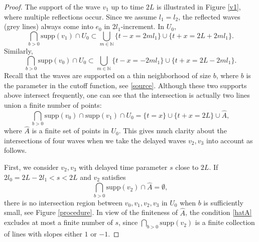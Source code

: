 \documentclass[11pt]{amsart}
\theoremstyle{definition}
\theoremstyle{plain}
\numberwithin{equation}{section}
\begin{document}
\begin{proof}
The support of the wave $v_1$ up to time $2L$ is illustrated in Figure \ref{v1}, where multiple reflections occur. Since we assume $l_1=l_2$, the reflected waves (grey lines) always come into $e_0$ in $2l_1$-increment.
In $U_0$,
$$\bigcap_{b>0}\textrm{supp}(v_1) \cap U_0 \subset \bigcup_{m\in \mathbb{N}} \{t-x=2m l_1\} \cup \{t+x=2L+2ml_1\}.$$
Similarly,
$$\bigcap_{b>0}\textrm{supp}(v_0) \cap U_0 \subset \bigcup_{m\in \mathbb{N}} \{t-x=-2m l_1\} \cup \{t+x=2L-2ml_1\}.$$
Recall that the waves are supported on a thin neighborhood of size $b$, where $b$ is the parameter in the cutoff function, see \eqref{source}.
Although these two supports above intersect frequently, one can see that the intersection is actually two lines union a finite number of points:
\begin{equation}\label{supp-01}
\bigcap_{b>0}\textrm{supp}(v_0) \cap \textrm{supp}(v_1) \cap U_0 =\{t=x\}\cup \{t+x=2L\} \cup \hat{A},
\end{equation}
where $\hat{A}$ is a finite set of points in $U_0$.
This gives much clarity about the intersections of four waves when we take the delayed waves $v_2,v_3$ into account as follows.


\smallskip
First, we consider $v_2,v_3$ with delayed time parameter $s$ close to $2L$. 
If $2l_0=2L-2l_1<s<2L$ and $v_2$ satisfies
\begin{equation}\label{hatA}
\bigcap_{b>0}\textrm{supp}(v_2) \cap \hat{A} =\emptyset,
\end{equation}
there is no intersection region between $v_0,v_1,v_2,v_3$ in $U_0$ when $b$ is sufficiently small, see Figure \ref{procedure}.
In view of the finiteness of $\hat{A}$, the condition \eqref{hatA} excludes at most a finite number of $s$, since $\bigcap_{b>0} \textrm{supp}(v_2)$ is a finite collection of lines with slopes either $1$ or $-1$.


\end{proof}
\end{document}
